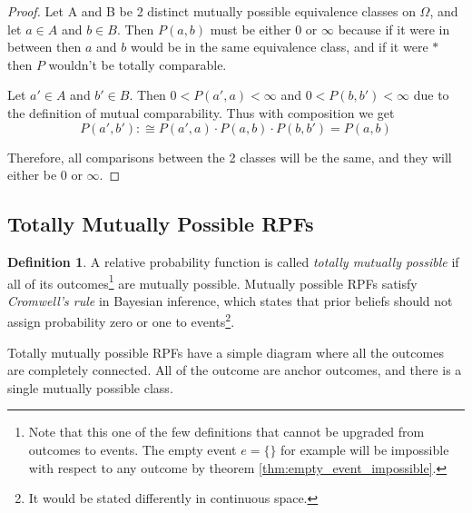 \documentclass[twoside]{article}
\theoremstyle{plain}%
\theoremstyle{definition}
\newtheorem{definition}{Definition}[section]
\theoremstyle{remark}
\begin{document}
\begin{proof}
Let A and B be 2 distinct mutually possible equivalence classes on \(\Omega\), and let \(a \in A\) and \(b \in B\). Then \(P(a, b)\) must be either 0 or \(\infty\) because if it were in between then \(a\) and \(b\) would be in the same equivalence class, and if it were \(\ast\) then \(P\) wouldn't be totally comparable.

Let \(a' \in A\) and \(b' \in B\). Then \(0 < P(a', a) < \infty\) and \(0 < P(b, b') < \infty\) due to the definition of mutual comparability. Thus with composition we get
\[P(a', b') :\cong P(a', a) \cdot P(a, b) \cdot P(b, b') = P(a, b)\]

Therefore, all comparisons between the 2 classes will be the same, and they will either be 0 or \(\infty\).
\end{proof}

\subsection{Totally Mutually Possible RPFs}

\begin{definition}
\label{def:totally_mutually_possible}
A relative probability function is called \textit{totally mutually possible} if all of its outcomes\footnote{Note that this one of the few definitions that cannot be upgraded from outcomes to events. The empty event \(e = \{\}\) for example will be impossible with respect to any outcome by theorem \ref{thm:empty_event_impossible}.} are mutually possible. Mutually possible RPFs satisfy \textit{Cromwell's rule} in Bayesian inference, which states that prior beliefs should not assign probability zero or one to events\footnote{It would be stated differently in continuous space.}.
\end{definition}

Totally mutually possible RPFs have a simple diagram where all the outcomes are completely connected. All of the outcome are anchor outcomes, and there is a single mutually possible class.
\end{document}
